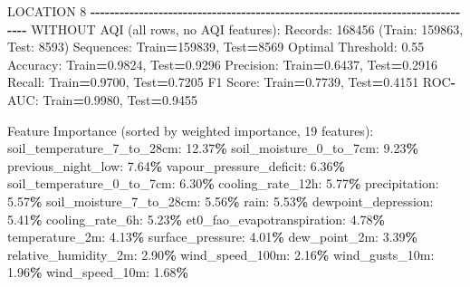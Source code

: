 \documentclass[
  letterpaper,
  DIV=11,
  numbers=noendperiod]{scrartcl}
\newenvironment{Shaded}{\begin{snugshade}}{\end{snugshade}}
\newcommand{\BuiltInTok}[1]{#1}
\newcommand{\DecValTok}[1]{\textcolor[rgb]{0.00,0.00,0.81}{#1}}
\newcommand{\FloatTok}[1]{\textcolor[rgb]{0.00,0.00,0.81}{#1}}
\newcommand{\NormalTok}[1]{#1}
\newcommand{\OperatorTok}[1]{\textcolor[rgb]{0.81,0.36,0.00}{\textbf{#1}}}
\begin{document}
\begin{Shaded}
\begin{Highlighting}[]
\NormalTok{LOCATION }\DecValTok{8}
\OperatorTok{{-}{-}{-}{-}{-}{-}{-}{-}{-}{-}{-}{-}{-}{-}{-}{-}{-}{-}{-}{-}{-}{-}{-}{-}{-}{-}{-}{-}{-}{-}{-}{-}{-}{-}{-}{-}{-}{-}{-}{-}{-}{-}{-}{-}{-}{-}{-}{-}{-}{-}{-}{-}{-}{-}{-}{-}{-}{-}{-}{-}{-}{-}{-}{-}{-}{-}{-}{-}{-}{-}{-}{-}{-}{-}{-}{-}{-}{-}{-}{-}}
\NormalTok{WITHOUT AQI (}\BuiltInTok{all}\NormalTok{ rows, no AQI features):}
\NormalTok{  Records: }\DecValTok{168456}\NormalTok{ (Train: }\DecValTok{159863}\NormalTok{, Test: }\DecValTok{8593}\NormalTok{)}
\NormalTok{  Sequences: Train}\OperatorTok{=}\DecValTok{159839}\NormalTok{, Test}\OperatorTok{=}\DecValTok{8569}
\NormalTok{  Optimal Threshold: }\FloatTok{0.55}
\NormalTok{  Accuracy: Train}\OperatorTok{=}\FloatTok{0.9824}\NormalTok{, Test}\OperatorTok{=}\FloatTok{0.9296}
\NormalTok{  Precision: Train}\OperatorTok{=}\FloatTok{0.6437}\NormalTok{, Test}\OperatorTok{=}\FloatTok{0.2916}
\NormalTok{  Recall: Train}\OperatorTok{=}\FloatTok{0.9700}\NormalTok{, Test}\OperatorTok{=}\FloatTok{0.7205}
\NormalTok{  F1 Score: Train}\OperatorTok{=}\FloatTok{0.7739}\NormalTok{, Test}\OperatorTok{=}\FloatTok{0.4151}
\NormalTok{  ROC}\OperatorTok{{-}}\NormalTok{AUC: Train}\OperatorTok{=}\FloatTok{0.9980}\NormalTok{, Test}\OperatorTok{=}\FloatTok{0.9455}

\NormalTok{  Feature Importance (}\BuiltInTok{sorted}\NormalTok{ by weighted importance, }\DecValTok{19}\NormalTok{ features):}
\NormalTok{    soil\_temperature\_7\_to\_28cm: }\FloatTok{12.37}\OperatorTok{\%}
\NormalTok{    soil\_moisture\_0\_to\_7cm: }\FloatTok{9.23}\OperatorTok{\%}
\NormalTok{    previous\_night\_low: }\FloatTok{7.64}\OperatorTok{\%}
\NormalTok{    vapour\_pressure\_deficit: }\FloatTok{6.36}\OperatorTok{\%}
\NormalTok{    soil\_temperature\_0\_to\_7cm: }\FloatTok{6.30}\OperatorTok{\%}
\NormalTok{    cooling\_rate\_12h: }\FloatTok{5.77}\OperatorTok{\%}
\NormalTok{    precipitation: }\FloatTok{5.57}\OperatorTok{\%}
\NormalTok{    soil\_moisture\_7\_to\_28cm: }\FloatTok{5.56}\OperatorTok{\%}
\NormalTok{    rain: }\FloatTok{5.53}\OperatorTok{\%}
\NormalTok{    dewpoint\_depression: }\FloatTok{5.41}\OperatorTok{\%}
\NormalTok{    cooling\_rate\_6h: }\FloatTok{5.23}\OperatorTok{\%}
\NormalTok{    et0\_fao\_evapotranspiration: }\FloatTok{4.78}\OperatorTok{\%}
\NormalTok{    temperature\_2m: }\FloatTok{4.13}\OperatorTok{\%}
\NormalTok{    surface\_pressure: }\FloatTok{4.01}\OperatorTok{\%}
\NormalTok{    dew\_point\_2m: }\FloatTok{3.39}\OperatorTok{\%}
\NormalTok{    relative\_humidity\_2m: }\FloatTok{2.90}\OperatorTok{\%}
\NormalTok{    wind\_speed\_100m: }\FloatTok{2.16}\OperatorTok{\%}
\NormalTok{    wind\_gusts\_10m: }\FloatTok{1.96}\OperatorTok{\%}
\NormalTok{    wind\_speed\_10m: }\FloatTok{1.68}\OperatorTok{\%}


\end{Highlighting}
\end{Shaded}
\end{document}
